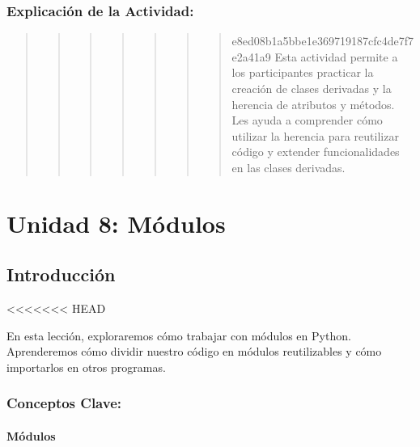 \documentclass[
  a4paper,
  DIV=11,
  numbers=noendperiod,
  onepage,
  openany]{scrreprt}
\begin{document}
\hypertarget{explicaciuxf3n-de-la-actividad-55}{%
\section{Explicación de la
Actividad:}\label{explicaciuxf3n-de-la-actividad-55}}

\begin{quote}
\begin{quote}
\begin{quote}
\begin{quote}
\begin{quote}
\begin{quote}
\begin{quote}
e8ed08b1a5bbe1e369719187cfc4de7f7e2a41a9 Esta actividad permite a los
participantes practicar la creación de clases derivadas y la herencia de
atributos y métodos. Les ayuda a comprender cómo utilizar la herencia
para reutilizar código y extender funcionalidades en las clases
derivadas.
\end{quote}
\end{quote}
\end{quote}
\end{quote}
\end{quote}
\end{quote}
\end{quote}

\part{Unidad 8: Módulos}

\hypertarget{introducciuxf3n-1}{%
\chapter{Introducción}\label{introducciuxf3n-1}}

\textless\textless\textless\textless\textless\textless\textless{} HEAD

En esta lección, exploraremos cómo trabajar con módulos en Python.
Aprenderemos cómo dividir nuestro código en módulos reutilizables y cómo
importarlos en otros programas.

\hypertarget{conceptos-clave-58}{%
\section{Conceptos Clave:}\label{conceptos-clave-58}}

\hypertarget{muxf3dulos}{%
\subsection{Módulos}\label{muxf3dulos}}
\end{document}
